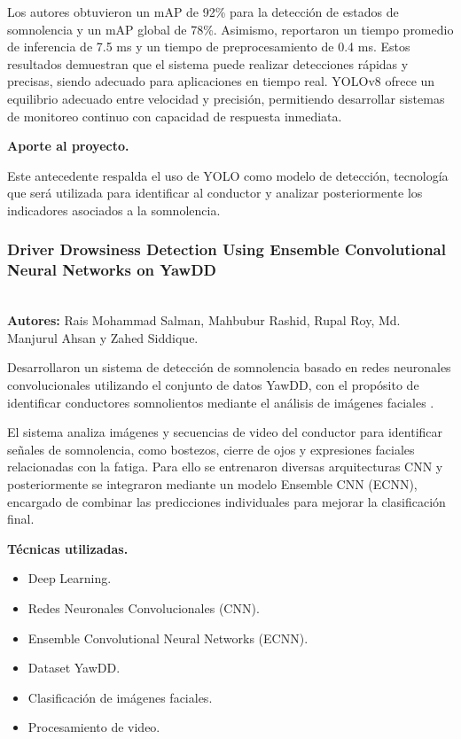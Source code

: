\documentclass[conference]{IEEEtran}
\begin{document}
Los autores obtuvieron un mAP de 92\% para la detección de estados de somnolencia y un mAP global de 78\%. Asimismo, reportaron un tiempo promedio de inferencia de 7.5 ms y un tiempo de preprocesamiento de 0.4 ms. Estos resultados demuestran que el sistema puede realizar detecciones rápidas y precisas, siendo adecuado para aplicaciones en tiempo real.
YOLOv8 ofrece un equilibrio adecuado entre velocidad y precisión, permitiendo desarrollar sistemas de monitoreo continuo con capacidad de respuesta inmediata.

\textbf{Aporte al proyecto.}

Este antecedente respalda el uso de YOLO como modelo de detección, tecnología que será utilizada para identificar al conductor y analizar posteriormente los indicadores asociados a la somnolencia.\\

\subsubsection{\textbf{Driver Drowsiness Detection Using Ensemble Convolutional Neural Networks on YawDD}} \mbox{}\\

\textbf{Autores:} Rais Mohammad Salman, Mahbubur Rashid, Rupal Roy, Md. Manjurul Ahsan y Zahed Siddique.

Desarrollaron un sistema de detección de somnolencia basado en redes neuronales convolucionales utilizando el conjunto de datos YawDD, con el propósito de identificar conductores somnolientos mediante el análisis de imágenes faciales \parencite{salman2021}.

El sistema analiza imágenes y secuencias de video del conductor para identificar señales de somnolencia, como bostezos, cierre de ojos y expresiones faciales relacionadas con la fatiga. Para ello se entrenaron diversas arquitecturas CNN y posteriormente se integraron mediante un modelo Ensemble CNN (ECNN), encargado de combinar las predicciones individuales para mejorar la clasificación final.

\textbf{Técnicas utilizadas.}

\begin{itemize}
\item Deep Learning.
\item Redes Neuronales Convolucionales (CNN).
\item Ensemble Convolutional Neural Networks (ECNN).
\item Dataset YawDD.
\item Clasificación de imágenes faciales.
\item Procesamiento de video.
\end{itemize}
\end{document}
